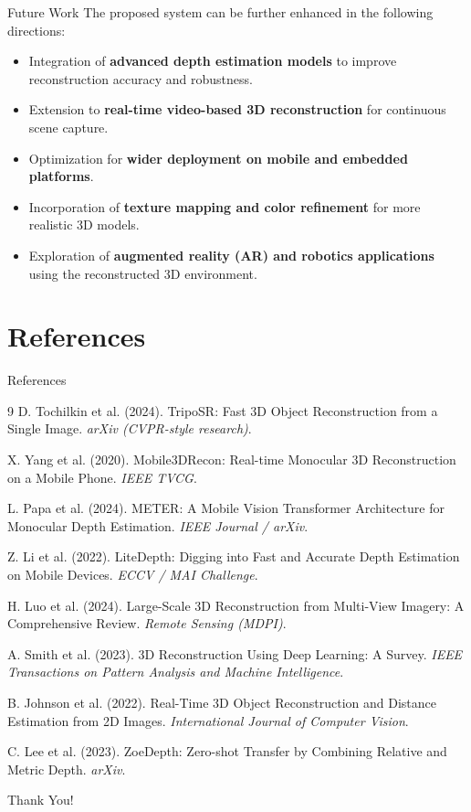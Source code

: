 \documentclass[11pt]{beamer}
\begin{document}
\begin{frame}{Future Work}
The proposed system can be further enhanced in the following directions:

\medskip
\begin{itemize}
\item Integration of \textbf{advanced depth estimation models} to improve reconstruction accuracy and robustness.
\item Extension to \textbf{real-time video-based 3D reconstruction} for continuous scene capture.
\item Optimization for \textbf{wider deployment on mobile and embedded platforms}.
\item Incorporation of \textbf{texture mapping and color refinement} for more realistic 3D models.
\item Exploration of \textbf{augmented reality (AR) and robotics applications} using the reconstructed 3D environment.
\end{itemize}
\end{frame}

\section{References}
\begin{frame}[allowframebreaks]{References}
\scriptsize
\begin{thebibliography}{9}
D. Tochilkin et al. (2024).
\newblock TripoSR: Fast 3D Object Reconstruction from a Single Image.
\newblock \textit{arXiv (CVPR-style research)}.

X. Yang et al. (2020).
\newblock Mobile3DRecon: Real-time Monocular 3D Reconstruction on a Mobile Phone.
\newblock \textit{IEEE TVCG}.

L. Papa et al. (2024).
\newblock METER: A Mobile Vision Transformer Architecture for Monocular Depth Estimation.
\newblock \textit{IEEE Journal / arXiv}.

Z. Li et al. (2022).
\newblock LiteDepth: Digging into Fast and Accurate Depth Estimation on Mobile Devices.
\newblock \textit{ECCV / MAI Challenge}.

H. Luo et al. (2024).
\newblock Large-Scale 3D Reconstruction from Multi-View Imagery: A Comprehensive Review.
\newblock \textit{Remote Sensing (MDPI)}.

A. Smith et al. (2023).
\newblock 3D Reconstruction Using Deep Learning: A Survey.
\newblock \textit{IEEE Transactions on Pattern Analysis and Machine Intelligence}.


B. Johnson et al. (2022).
\newblock Real-Time 3D Object Reconstruction and Distance Estimation from 2D Images.
\newblock \textit{International Journal of Computer Vision}.

C. Lee et al. (2023).
\newblock ZoeDepth: Zero-shot Transfer by Combining Relative and Metric Depth.
\newblock \textit{arXiv}.
\end{thebibliography}
\end{frame}

\begin{frame}
\begin{center}
    \Huge{Thank You!}
\end{center}
\end{frame}
\end{document}
